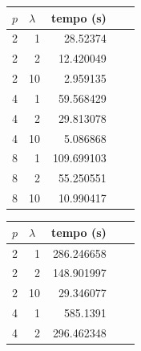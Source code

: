 \documentclass[a4paper,12pt]{article}
\begin{document}
        \begin{table}[]
            \centering
            \begin{tabular}{rrrll}
                \hline
                \multicolumn{1}{l}{$p$}   & \multicolumn{1}{l}{$\lambda$} & \multicolumn{1}{l}{tempo (s)}  \\ \hline
                2                       & 1                             & 28.52374                       \\
                2                       & 2                             & 12.420049                      \\
                2                       & 10                            & 2.959135                       \\
                4                       & 1                             & 59.568429                      \\
                4                       & 2                             & 29.813078                      \\
                4                       & 10                            & 5.086868                       \\
                8                       & 1                             & 109.699103                     \\
                8                       & 2                             & 55.250551                      \\ 
                8                       & 10                            & 10.990417                      \\ \hline
            \end{tabular}
            \begin{tabular}{rrrll}
                \hline
                \multicolumn{1}{l}{$p$} & \multicolumn{1}{l}{$\lambda$} & \multicolumn{1}{l}{tempo (s)} \\ \hline
                2                       & 1                           & 286.246658                    \\
                2                       & 2                           & 148.901997                    \\
                2                       & 10                          & 29.346077                     \\
                4                       & 1                           & 585.1391                      \\
                4                       & 2                           & 296.462348                    \\

\end{tabular}
\end{table}
\end{document}
